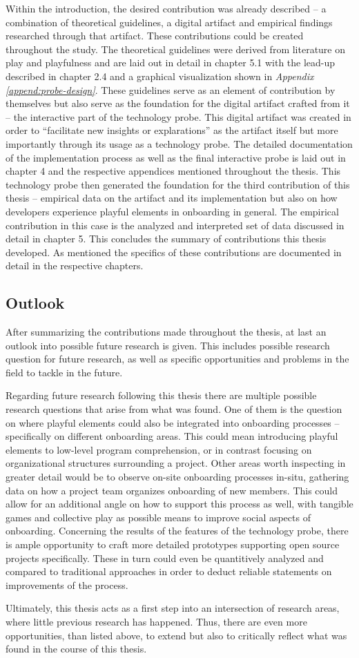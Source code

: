 Within the introduction, the desired contribution was already described -- a combination of theoretical guidelines, a digital artifact and empirical findings researched through that artifact. These contributions could be created throughout the study. The theoretical guidelines were derived from literature on play and playfulness and are laid out in detail in chapter 5.1 with the lead-up described in chapter 2.4 and a graphical visualization shown in \textit{Appendix \ref{append:probe-design}}. These guidelines serve as an element of contribution by themselves but also serve as the foundation for the digital artifact crafted from it -- the interactive part of the technology probe. This digital artifact was created in order to \enquote{facilitate new insights or explarations} \cite[p. 2]{wobbrock2016research} as the artifact itself but more importantly through its usage as a technology probe. The detailed documentation of the implementation process as well as the final interactive probe is laid out in chapter 4 and the respective appendices mentioned throughout the thesis. This technology probe then generated the foundation for the third contribution of this thesis -- empirical data on the artifact and its implementation but also on how developers experience playful elements in onboarding in general. The empirical contribution in this case is the analyzed and interpreted set of data discussed in detail in chapter 5. This concludes the summary of contributions this thesis developed. As mentioned the specifics of these contributions are documented in detail in the respective chapters.

\subsection{Outlook}

After summarizing the contributions made throughout the thesis, at last an outlook into possible future research is given. This includes possible research question for future research, as well as specific opportunities and problems in the field to tackle in the future.

Regarding future research following this thesis there are multiple possible research questions that arise from what was found. One of them is the question on where playful elements could also be integrated into onboarding processes -- specifically on different onboarding areas. This could mean introducing playful elements to low-level program comprehension, or in contrast focusing on organizational structures surrounding a project. Other areas worth inspecting in greater detail would be to observe on-site onboarding processes in-situ, gathering data on how a project team organizes onboarding of new members. This could allow for an additional angle on how to support this process as well, with tangible games and collective play as possible means to improve social aspects of onboarding. Concerning the results of the features of the technology probe, there is ample opportunity to craft more detailed prototypes supporting open source projects specifically. These in turn could even be quantitively analyzed and compared to traditional approaches in order to deduct reliable statements on improvements of the process.

Ultimately, this thesis acts as a first step into an intersection of research areas, where little previous research has happened. Thus, there are even more opportunities, than listed above, to extend but also to critically reflect what was found in the course of this thesis.